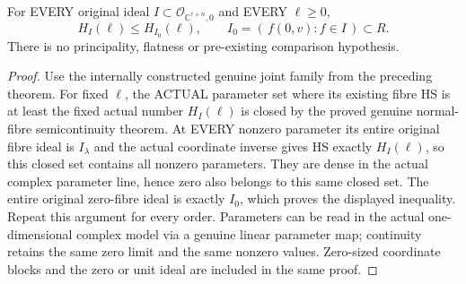 \begin{theorem}
\label{hir:actual-coordinate-specialization-all-order-hs-inequality}
\leanok
{}
For EVERY original ideal $I\subset\mathcal O_{\mathbb C^{r+n},0}$ and
EVERY $\ell\ge0$,
\[
 H_I(\ell)\le H_{I_0}(\ell),
 \qquad I_0=(\,f(0,v):f\in I\,)\subset R.
\]
There is no principality, flatness or pre-existing comparison hypothesis.
\end{theorem}
\begin{proof}
Use the internally constructed genuine joint family from the preceding
theorem. For fixed $\ell$, the ACTUAL parameter set where its existing
fibre HS is at least the fixed actual number $H_I(\ell)$ is closed by
the proved genuine normal-fibre semicontinuity theorem. At EVERY nonzero
parameter its entire original fibre ideal is $I_\lambda$ and the actual
coordinate inverse gives HS exactly $H_I(\ell)$, so this closed set
contains all nonzero parameters. They are dense in the actual complex
parameter line, hence zero also belongs to this same closed set. The
entire original zero-fibre ideal is exactly $I_0$, which proves the
displayed inequality. Repeat this argument for every order. Parameters can
be read in the actual one-dimensional complex model via a genuine linear
parameter map; continuity retains the same zero limit and the same
nonzero values. Zero-sized coordinate blocks and the zero or unit ideal
are included in the same proof.
\end{proof}
